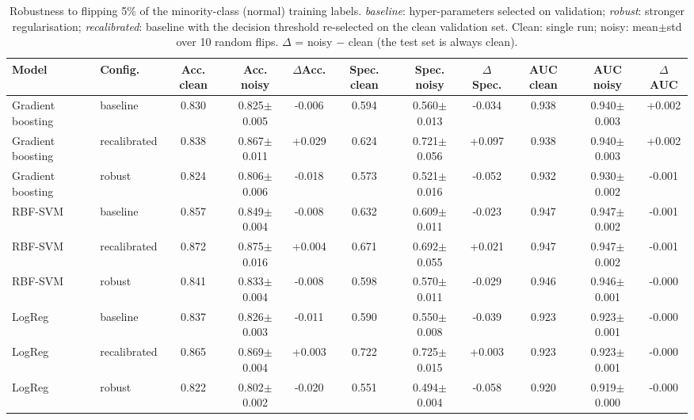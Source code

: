 \begin{table}[t]
\centering
\small
\caption{Robustness to flipping 5\% of the minority-class (normal) training labels. \emph{baseline}: hyper-parameters selected on validation; \emph{robust}: stronger regularisation; \emph{recalibrated}: baseline with the decision threshold re-selected on the clean validation set. Clean: single run; noisy: mean$\pm$std over 10 random flips. $\Delta$ = noisy $-$ clean (the test set is always clean).}
\label{tab:noise5}
\begin{adjustbox}{max width=\textwidth}
\begin{tabular}{llccccccccc}
\toprule
Model & Config. & Acc. clean & Acc. noisy & $\Delta$Acc. & Spec. clean & Spec. noisy & $\Delta$Spec. & AUC clean & AUC noisy & $\Delta$AUC \\
\midrule
Gradient boosting & baseline & 0.830 & 0.825$\pm$0.005 & -0.006 & 0.594 & 0.560$\pm$0.013 & -0.034 & 0.938 & 0.940$\pm$0.003 & +0.002 \\
Gradient boosting & recalibrated & 0.838 & 0.867$\pm$0.011 & +0.029 & 0.624 & 0.721$\pm$0.056 & +0.097 & 0.938 & 0.940$\pm$0.003 & +0.002 \\
Gradient boosting & robust & 0.824 & 0.806$\pm$0.006 & -0.018 & 0.573 & 0.521$\pm$0.016 & -0.052 & 0.932 & 0.930$\pm$0.002 & -0.001 \\
RBF-SVM & baseline & 0.857 & 0.849$\pm$0.004 & -0.008 & 0.632 & 0.609$\pm$0.011 & -0.023 & 0.947 & 0.947$\pm$0.002 & -0.001 \\
RBF-SVM & recalibrated & 0.872 & 0.875$\pm$0.016 & +0.004 & 0.671 & 0.692$\pm$0.055 & +0.021 & 0.947 & 0.947$\pm$0.002 & -0.001 \\
RBF-SVM & robust & 0.841 & 0.833$\pm$0.004 & -0.008 & 0.598 & 0.570$\pm$0.011 & -0.029 & 0.946 & 0.946$\pm$0.001 & -0.000 \\
LogReg & baseline & 0.837 & 0.826$\pm$0.003 & -0.011 & 0.590 & 0.550$\pm$0.008 & -0.039 & 0.923 & 0.923$\pm$0.001 & -0.000 \\
LogReg & recalibrated & 0.865 & 0.869$\pm$0.004 & +0.003 & 0.722 & 0.725$\pm$0.015 & +0.003 & 0.923 & 0.923$\pm$0.001 & -0.000 \\
LogReg & robust & 0.822 & 0.802$\pm$0.002 & -0.020 & 0.551 & 0.494$\pm$0.004 & -0.058 & 0.920 & 0.919$\pm$0.000 & -0.000 \\
\bottomrule
\end{tabular}
\end{adjustbox}
\end{table}
